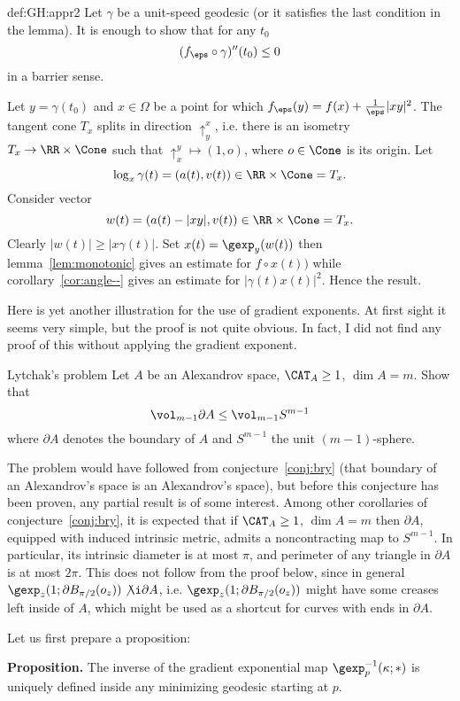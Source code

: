 {\begin{subthm}{def:GH:appr2}
Let $\gamma$ be a unit-speed geodesic (or it satisfies the last condition in the lemma). 
It is enough to show that for any $t_0$
$$(f_\eps\circ\gamma)''(t_0)\le0$$
in a barrier sense. 

Let $y=\gamma(t_0)$ and $x\in \Omega$ be a point for which 
$f_\eps(y)=f(x)+\tfrac1\eps|x y|^2$.
The tangent cone $T_x$ splits in direction $\uparrow_y^x$,
i.e. there is an isometry $T_x\to \RR\times \Cone$ such that $\uparrow_x^y\mapsto(1,o)$, where $o\in\Cone$ is its origin.
Let 
$$\log_x\gamma(t)=(a(t),v(t))\in\RR\times \Cone=T_x.$$
Consider vector 
$$w(t)=(a(t)-|x y|,v(t))\in \RR\times \Cone=T_x.$$ 
Clearly $|w(t)|\ge|x\gamma(t)|$.
Set $x(t)=\gexp_y(w(t))$ then lemma~\ref{lem:monotonic} gives an estimate for $f\circ x(t))$ while corollary~\ref{cor:angle--} gives an estimate for $|\gamma(t)x(t)|^2$. Hence the result.
\qeds




Here is yet another illustration for the use of gradient exponents.
At first sight it seems very simple, but the proof is not quite obvious.
In fact, I did not find any proof of this without applying the gradient exponent. 

\begin{thm} {Lytchak's problem}\label{lyt-prob} Let $A$ be an Alexandrov space, $\CAT_A\ge1$, $\dim A=m$. 
Show
that
$$\vol_{m-1}\partial A\le \vol_{m-1}S^{m-1}$$
where $\partial A$ denotes the boundary of $A$ and $S^{m-1}$ the unit $(m-1)$-sphere.
\end{thm}

The problem would have followed from conjecture~\ref{conj:bry} (that boundary of
an Alexandrov's space is an Alexandrov's space), but before this conjecture has been proven, any partial
result is of some interest.
Among other corollaries of
conjecture~\ref{conj:bry}, it is expected that if $\CAT_A\ge1$, $\dim A=m$ then $\partial
A$, equipped with induced intrinsic metric, admits a noncontracting map to
$S^{m-1}$. 
In particular, its intrinsic diameter is at most $\pi$, and perimeter
of any triangle in $\partial A$ is at most $2\pi$. 
This does not follow from the proof below, since in general $\gexp_z(1;\partial
B_{\pi/2}(o_z))\not\i\partial A$, i.e. $\gexp_z(1;\partial B_{\pi/2}(o_z))$
might have some creases left inside of $A$, which might be used as a shortcut for
curves with ends in $\partial A$.

Let us first prepare a proposition:

\begin{thm}{\bf Proposition.}\label{prop:unique-gexp-inverse}
The inverse of the gradient exponential map $\gexp^{-1}_p(\kappa;*)$ is uniquely
defined inside any minimizing geodesic starting at $p$.
\end{thm}


\end{subthm}}
